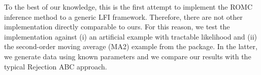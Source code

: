 \documentclass[article]{jss}
\begin{document}
To the best of our knowledge, this is the first attempt to implement
the ROMC inference method to a generic LFI framework. Therefore, there
are not other implementation directly comparable to ours. For this
reason, we test the implementation against (i) an artificial example
with tractable likelihood and (ii) the second-order moving average
(MA2) example from the  package. In the latter, we generate
data using known parameters and we compare our results with the
typical Rejection ABC approach.








\end{document}
